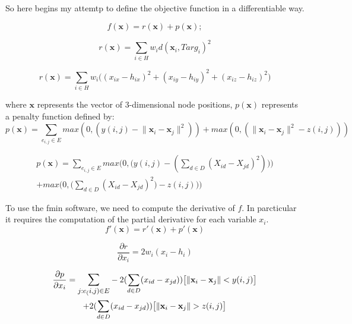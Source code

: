 \documentclass[11pt]{article}
\begin{document}
So here begins my attemtp to define the objective function in a differentiable way.

\begin{equation}
  f(\mathbf{x}) = r(\mathbf{x}) + p(\mathbf{x});
\end{equation}

\begin{equation}
  r(\mathbf{x}) = \sum_{i \in H} w_id(\mathbf{x}_i,Targ_i)^2 
\end{equation}

\begin{equation}
  r(\mathbf{x}) = \sum_{i \in H} w_i\big((x_{ix} - h_{ix})^2 + (x_{iy} - h_{iy})^2 + (x_{iz} - h_{iz})^2\big)
\end{equation}

where $\mathbf{x}$ represents the vector of 3-dimensional node positions, $p(\mathbf{x})$
represents a penalty function defined by:
\begin{equation}
  p(\mathbf{x}) = \sum_{e_{i,j} \in E} max(0, (y(i,j) - \lVert \mathbf{x}_i - \mathbf{x}_j \rVert^2  ))
  + max(0,  (\lVert \mathbf{x}_i - \mathbf{x}_j \rVert^2 - z(i,j) ))
\end{equation}


\begin{multline}
  p(\mathbf{x}) = \sum_{e_{i,j} \in E} max \bigg(0, \Big(y(i,j) - ( \sum_{d \in D}(X_{id} - X_{jd})^2 )  \Big) \bigg) \\
  + max \bigg(0,  \Big(\sum_{d \in D}(X_{id} - X_{jd})^2) - z(i,j) \Big) \bigg)
\end{multline}

To use the fmin software, we need to compute the derivative of $f$. In parcticular
it requires the computation of the partial derivative for each variable $x_i$.
\begin{equation}
  f'(\mathbf{x}) = r'(\mathbf{x}) + p'(\mathbf{x})
\end{equation}

\begin{equation}
  \frac{\partial r}{\partial x_i}  =  2w_i(x_i - h_i)
\end{equation}

\begin{multline}
  \frac{\partial p}{\partial x_i}
  =  \mathlarger{\sum_{j:e_(i,j) \in E}}
  -2(\sum_{d \in D}(x_{id} - x_{jd}))\big[\lVert \mathbf{x}_i - \mathbf{x}_j \rVert < y(i,j)\big]\\
  + 2(\sum_{d \in D}(x_{id} - x_{jd}))\big[\lVert \mathbf{x}_i - \mathbf{x}_j \rVert > z(i,j)\big]
\end{multline}
\end{document}
